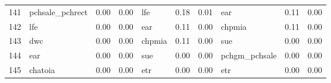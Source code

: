 \documentclass[12pt]{article}
\begin{document}
\begin{landscape}
\begin{footnotesize}
\begin{longtable}{l|lcc|lcc|lcc}
			141                   & pchsale\_pchrect            & 0.00                                                                                 & 0.00                            & lfe                         & 0.18                                                                                 & 0.01                            & ear                         & 0.11                                                                                 & 0.00                           \\
			142                   & lfe                         & 0.00                                                                                 & 0.00                            & ear                         & 0.11                                                                                 & 0.00                            & chpmia                      & 0.11                                                                                 & 0.00                           \\
			143                   & dwc                         & 0.00                                                                                 & 0.00                            & chpmia                      & 0.11                                                                                 & 0.00                            & sue                         & 0.00                                                                                 & 0.00                           \\
			144                   & ear                         & 0.00                                                                                 & 0.00                            & sue                         & 0.00                                                                                 & 0.00                            & pchgm\_pchsale              & 0.00                                                                                 & 0.00                           \\
			145                   & chatoia                     & 0.00                                                                                 & 0.00                            & etr                         & 0.00                                                                                 & 0.00                            & etr                         & 0.00                                                                                 & 0.00                           \\ \hline

\end{longtable}
\end{footnotesize}
\end{landscape}
\end{document}
